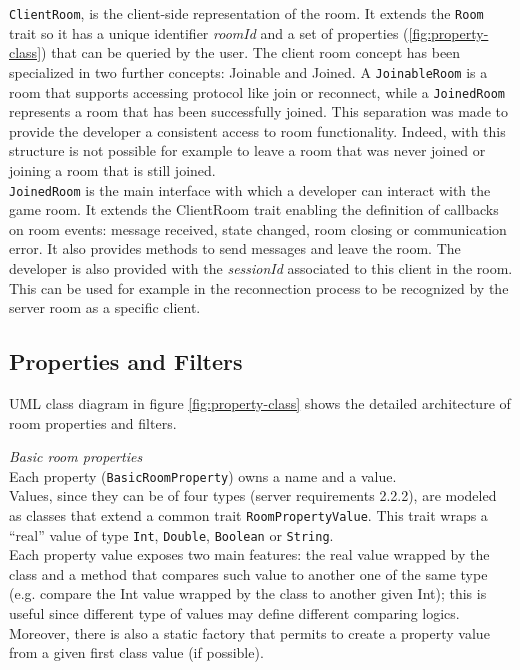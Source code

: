 \texttt{ClientRoom}, is the client-side representation of the room. It extends the \texttt{Room} trait so it has a unique identifier \textit{roomId} and a set of properties (\ref{fig:property-class}) that can be queried by the user. 
The client room concept has been specialized in two further concepts: Joinable and Joined.
A \texttt{JoinableRoom} is a room that supports accessing protocol like join or reconnect, while
a \texttt{JoinedRoom} represents a room that has been successfully joined. 
This separation was made to provide the developer a consistent access to room functionality. Indeed, with this structure is not possible for example to leave a room that was never joined or joining a room that is still joined.
\\
\texttt{JoinedRoom} is the main interface with which a developer can interact with the game room.
It extends the ClientRoom trait enabling the definition of callbacks on room events: message received, state changed, room closing or communication error.
It also provides methods to send messages and leave the room. 
The developer is also provided with the \textit{sessionId} associated to this client in the room.
This can be used for example in the reconnection process to be recognized by the server room as a specific client.


\subsection{Properties and Filters}  \label{room_properties_section}
UML class diagram in figure \ref{fig:property-class} shows the detailed architecture of room properties and filters.

\bigskip
\textit{Basic room properties}
\\
Each property (\texttt{BasicRoomProperty}) owns a name and a value.
\\
Values, since they can be of four types (server requirements 2.2.2), are modeled as classes that extend a common trait \texttt{RoomPropertyValue}. This trait wraps a ``real'' value of type \texttt{Int}, \texttt{Double}, \texttt{Boolean} or \texttt{String}.
\\
Each property value exposes two main features: the real value wrapped by the class and a method that compares such value to another one of the same type (e.g. compare the Int value wrapped by the class to another given Int); this is useful since different type of values may define different comparing logics.
Moreover, there is also a static factory that permits to create a property value from a given first class value (if possible).


